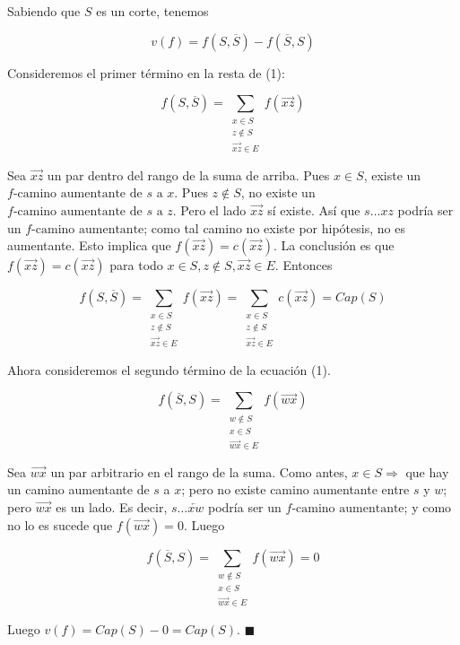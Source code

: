 \documentclass[11pt, a4paper]{article}
\theoremstyle{definition}
\begin{document}
\begin{enumerate}
\begin{itemize}
            Sabiendo que \( S \) es un corte, tenemos
            
            \[ v(f) = f(S, \overline{S}) - f(\overline{S}, S) \tag{1} \]
            
            Consideremos el primer término en la resta de (1):
            
            \[ f(S, \overline{S}) = \sum_{\substack{x \in S \\ z \notin S \\ \overrightarrow{xz} \in E}} f(\overrightarrow{xz}) \]
            
            Sea \(\overrightarrow{xz}\) un par dentro del rango de la suma de arriba. 
            Pues \( x \in S \), existe un \( f\text{-camino aumentante de } s \text{ a } x \). 
            Pues \( z \notin S \), no existe un \( f\text{-camino aumentante de } s \text{ a } z \). 
            Pero el lado \(\overrightarrow{xz}\) sí existe. Así que \( s \ldots xz \) podría ser un \( f\text{-camino aumentante} \); 
            como tal camino no existe por hipótesis, no es aumentante. 
            Esto implica que \( f(\overrightarrow{xz}) = c(\overrightarrow{xz}) \). 
            La conclusión es que \( f(\overrightarrow{xz}) = c(\overrightarrow{xz}) \) para todo \( x \in S, z \notin S, \overrightarrow{xz} \in E \). 
            Entonces

            \[ f(S, \overline{S}) = \sum_{\substack{x \in S \\ z \notin S \\ \overrightarrow{xz} \in E}} f(\overrightarrow{xz}) = \sum_{\substack{x \in S \\ z \notin S \\ \overrightarrow{xz} \in E}} c(\overrightarrow{xz}) = Cap(S) \]

            Ahora consideremos el segundo término de la ecuación (1).

            \[ f(\overline{S}, S) = \sum_{\substack{w \notin S \\ x \in S \\ \overrightarrow{wx} \in E}} f(\overrightarrow{wx}) \]

            Sea \(\overrightarrow{wx}\) un par arbitrario en el rango de la suma. Como antes, \( x \in S \Rightarrow \) que hay un camino aumentante de \( s \) a \( x \); pero no existe camino aumentante entre \( s \) y \( w \); pero \(\overrightarrow{wx}\) es un lado. Es decir, \( s \ldots \overleftarrow{xw} \) podría ser un \( f\text{-camino aumentante}\); y como no lo es sucede que \( f(\overrightarrow{wx}) = 0 \). Luego

            \[ f(\overline{S}, S) = \sum_{\substack{w \notin S \\ x \in S \\ \overrightarrow{wx} \in E}} f(\overrightarrow{wx}) = 0 \]

            Luego \( v(f) = Cap(S) - 0 = Cap(S) \). \(\blacksquare\)
        \end{itemize}

    \end{enumerate}
\end{document}
